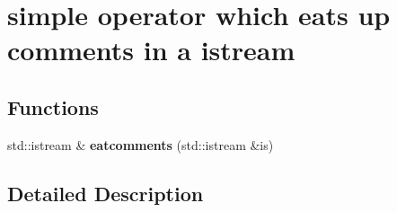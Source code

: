 \hypertarget{group__eatcomments}{}\section{simple operator which eats up comments in a istream}
\label{group__eatcomments}
\subsection*{Functions}
\begin{DoxyCompactItemize}
\item 
\mbox{\label{group__eatcomments_gaf335822cd26b3fbb2fd458447c8073be}} 
std\+::istream \& {\bfseries eatcomments} (std\+::istream \&is)
\end{DoxyCompactItemize}


\subsection{Detailed Description}
